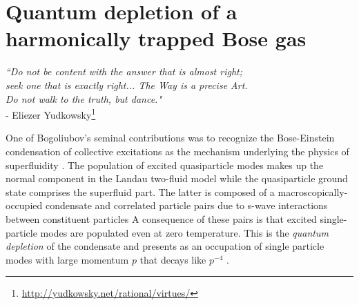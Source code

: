 \chapter{Quantum depletion of a harmonically trapped Bose gas}
\label{chap:QD}

\begin{adjustwidth}{2cm}{0cm}
\begin{flushright}
\emph{``Do not be content with the answer that is almost right; \\
	seek one that is exactly right... The Way is a precise Art.\\
	Do not walk to the truth, but dance."} 
	\\- Eliezer Yudkowsky\footnote{\url{http://yudkowsky.net/rational/virtues/}}
\end{flushright}
\end{adjustwidth}



	{One} of Bogoliubov's seminal contributions was to recognize the Bose-Einstein condensation of collective excitations as the mechanism underlying the physics of superfluidity \cite{Bogolubov47}.
	The population of excited quasiparticle modes makes up the normal component in the Landau two-fluid model while the %
	quasiparticle ground state comprises the superfluid part. {The latter is composed of a macroscopically-occupied condensate and correlated particle pairs due to s-wave interactions between constituent particles \cite{Bogolubov47,Vogels02}} 
	{A consequence of these pairs is  %
	that excited} single-particle modes %
	are populated even at zero temperature. %
	This is the \emph{quantum depletion} of the condensate and presents as an occupation of single particle modes with large momentum $p$ that decays like $p^{-4}$ \cite{PitaevskiiStringari,Decamp18}.

